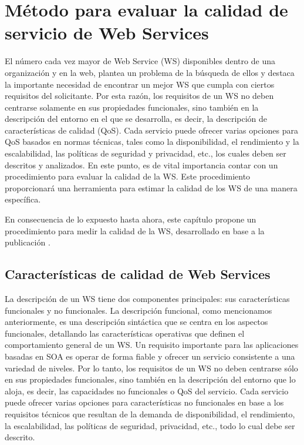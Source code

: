 \chapter{Método para evaluar la calidad de servicio de Web Services}
\label{Método para evaluar la calidad de servicio de Web Services}

El número cada vez mayor de Web Service (WS) disponibles dentro de una organización y en la web, plantea un problema de la búsqueda de ellos y destaca la importante necesidad de encontrar un mejor WS que cumpla con ciertos requisitos del solicitante. Por esta razón, los requisitos de un WS no deben centrarse solamente en sus propiedades funcionales, sino también en la descripción del entorno en el que se desarrolla, es decir, la descripción de características de calidad (QoS). Cada servicio puede ofrecer varias opciones para QoS basados en normas técnicas, tales como la disponibilidad, el rendimiento y la escalabilidad, las políticas de seguridad y privacidad, etc., los cuales deben ser descritos y analizados. En este punto, es de vital importancia contar con un procedimiento para evaluar la calidad de la WS. Este procedimiento proporcionará una herramienta para estimar la calidad de los WS de una manera específica. 

En consecuencia de lo expuesto hasta ahora, este capítulo propone un procedimiento para medir la calidad de la WS, desarrollado en base a la publicación \cite{QoS-WS-invoked}.\\

\section{Características de calidad de Web Services}
\label{Características de calidad de Web Services}

La descripción de un WS tiene dos componentes principales: sus características funcionales y no funcionales. La descripción funcional, como mencionamos anteriormente, es una descripción sintáctica que se centra en los aspectos funcionales, detallando las características operativas que definen el comportamiento general de un WS. Un requisito importante para las aplicaciones basadas en SOA es operar de forma fiable y ofrecer un servicio consistente a una variedad de niveles. Por lo tanto, los requisitos de un WS no deben centrarse sólo en sus propiedades funcionales, sino también en la descripción del entorno que lo aloja, es decir, las capacidades no funcionales o QoS del servicio. Cada servicio puede ofrecer varias opciones para características no funcionales en base a los requisitos técnicos que resultan de la demanda de disponibilidad, el rendimiento, la escalabilidad, las políticas de seguridad, privacidad, etc., todo lo cual debe ser descrito.

